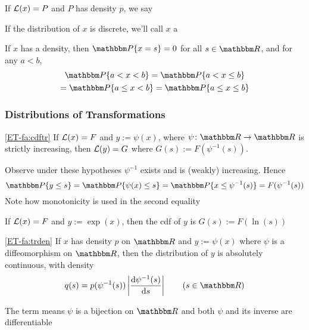 \begin{frame}
    
    \vspace{2em}
    If $\mathcal L(x) = P$ and $P$ has density $p$, we say
    
    If the distribution of $x$ is discrete, we'll call
    $x$ a 
    
    \vspace{1em}
    \Fact
    If $x$ has a density, then $\PP\{x=s\}=0$ for all $s \in \RR$, and for
    any $a < b$,
    \begin{multline*}
        \PP\{a < x < b\}
        = \PP\{a < x \leq b\}
        \\ = \PP\{a \leq x < b\}
        = \PP\{a \leq x \leq b\}
    \end{multline*}
\end{frame}

\begin{frame}\frametitle{Distributions of Transformations}

    \vspace{2em}
    \Fact\eqref{ET-fa:cdftr}
    If $\mathcal L(x) = F$ and $y := \psi(x)$, where $\psi \colon \RR \to \RR$ is
    strictly increasing, then $\mathcal L(y)= G$ where $G(s) := F(\psi^{-1}(s))$.
    
    \Prf
    Observe under these hypotheses $\psi^{-1}$ exists and is
    (weakly) increasing.  Hence 
    \begin{equation*}
        \PP\{y \leq s\} 
        = \PP\{\psi(x) \leq s\} 
        = \PP\{x \leq \psi^{-1}(s) \} 
        = F( \psi^{-1}(s) )
    \end{equation*}
    Note how monotonicity is used in the second equality

\end{frame}

\begin{frame}

    \vspace{2em}
    \Eg
    If $\mathcal L(x) = F$ and $y := \exp(x)$, then the {\sc cdf} of $y$ is $G(s) := F(\ln(s))$
    
\end{frame}

\begin{frame}

    \vspace{2em}
    \Fact\eqref{ET-fa:trden}
    If $x$ has density $p$ on $\RR$ and $y := \psi(x)$ where $\psi$ is a
    diffeomorphism on $\RR$, then the distribution of $y$ is absolutely
    continuous, with density
    \begin{equation*}
        \label{eq:trden}
        q(s) = p(\psi^{-1}(s)) \left| \frac{\diff \psi^{-1}(s)}{\diff s} \right|
                 \qquad (s \in \RR)
    \end{equation*}
    
    
    \vspace{1em}
    The term  means  $\psi$ is a bijection on
    $\RR$ and both $\psi$ and its inverse are differentiable
    
\end{frame}

